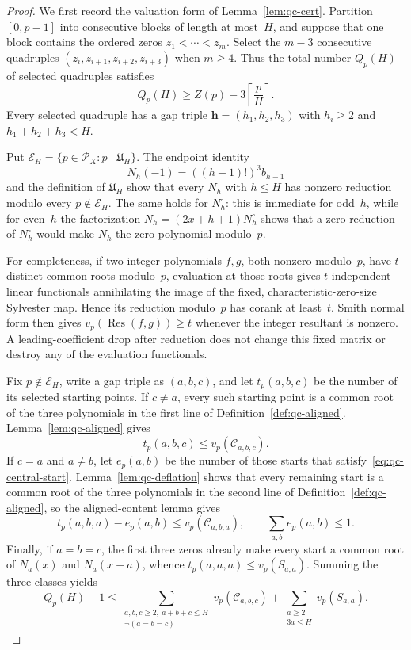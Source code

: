 \begin{proof}
We first record the valuation form of
Lemma~\ref{lem:qc-cert}.  Partition $[0,p-1]$ into consecutive blocks
of length at most~$H$, and suppose that one block contains the ordered
zeros $z_1<\cdots<z_m$.  Select the $m-3$ consecutive quadruples
$(z_i,z_{i+1},z_{i+2},z_{i+3})$ when $m\ge4$.  Thus the total number
$Q_p(H)$ of selected quadruples satisfies
\begin{equation}\label{eq:qc-block-lower}
 Q_p(H)\ge Z(p)-3\left\lceil\frac pH\right\rceil.
\end{equation}
Every selected quadruple has a gap triple
$\boldsymbol h=(h_1,h_2,h_3)$ with $h_i\ge2$ and
$h_1+h_2+h_3<H$.

Put $\mathcal E_H=\{p\in\mathcal P_X:p\mid\mathfrak U_H\}$.
The endpoint identity
\[
 N_h(-1)=((h-1)!)^3b_{h-1}
\]
and the definition of $\mathfrak U_H$ show that every $N_h$ with
$h\le H$ has nonzero reduction modulo every
$p\notin\mathcal E_H$.  The same holds for $N_h^\circ$: this is
immediate for odd~$h$, while for even~$h$ the factorization
$N_h=(2x+h+1)N_h^\circ$ shows that a zero reduction of $N_h^\circ$
would make $N_h$ the zero polynomial modulo~$p$.

For completeness, if two integer polynomials $f,g$, both nonzero
modulo~$p$, have $t$ distinct common roots modulo~$p$, evaluation at
those roots gives $t$ independent linear functionals annihilating the
image of the fixed, characteristic-zero-size Sylvester map.  Hence its
reduction modulo~$p$ has corank at least~$t$.  Smith normal form then
gives $v_p(\operatorname{Res}(f,g))\ge t$ whenever the integer
resultant is nonzero.  A leading-coefficient drop after reduction does
not change this fixed matrix or destroy any of the evaluation
functionals.

Fix $p\notin\mathcal E_H$, write a gap triple as $(a,b,c)$, and let
$t_p(a,b,c)$ be the number of its selected starting points.  If
$c\ne a$, every such starting point is a common root of the three
polynomials in the first line of Definition~\ref{def:qc-aligned}.
Lemma~\ref{lem:qc-aligned} gives
\[
 t_p(a,b,c)
 \le v_p(\mathcal C_{a,b,c}).
\]
If $c=a$ and $a\ne b$, let $e_p(a,b)$ be the number of those starts
that satisfy~\eqref{eq:qc-central-start}.  Lemma~\ref{lem:qc-deflation}
shows that every remaining start is a common root of the three
polynomials in the second line of Definition~\ref{def:qc-aligned}, so
the aligned-content lemma gives
\[
 t_p(a,b,a)-e_p(a,b)
 \le v_p(\mathcal C_{a,b,a}),
 \qquad
 \sum_{a,b}e_p(a,b)\le1.
\]
Finally, if $a=b=c$, the first three zeros already make every start a
common root of $N_a(x)$ and $N_a(x+a)$, whence
$t_p(a,a,a)\le v_p(S_{a,a})$.  Summing the three classes yields
\begin{equation}\label{eq:qc-valuation}
 Q_p(H)-1\le
 \sum_{\substack{a,b,c\ge2,\ a+b+c\le H\\
                  \neg(a=b=c)}}
 v_p(\mathcal C_{a,b,c})
 +\sum_{\substack{a\ge2\\3a\le H}}v_p(S_{a,a}).
\end{equation}


\end{proof}
